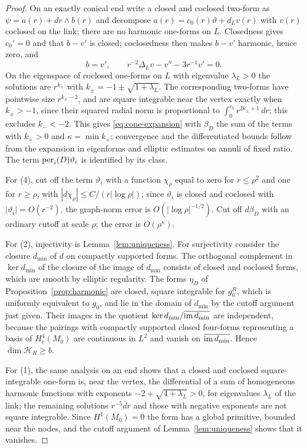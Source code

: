 \begin{proof}
On an exactly conical end write a closed and coclosed two-form as
$\psi=a(r)+dr\wedge b(r)$ and decompose
$a(r)=c_0(r)\vartheta+d_Lv(r)$ with $v(r)$ coclosed on the link; there are
no harmonic one-forms on $L$. Closedness gives $c_0'=0$ and that $b-v'$
is closed; coclosedness then makes $b-v'$ harmonic, hence zero, and
\[
 b=v',\qquad r^{-2}\Delta_Lv-v''-3r^{-1}v'=0 .
\]
On the eigenspace of coclosed one-forms on $L$ with eigenvalue
$\lambda_L>0$ the solutions are $r^{k_\pm}$ with
$k_\pm=-1\pm\sqrt{1+\lambda_L}$. The corresponding two-forms have
pointwise size $r^{k_\pm-2}$, and are square integrable near the vertex
exactly when $k_\pm>-1$, since their squared radial norm is proportional
to $\int_0^{r_0}r^{2k_\pm+1}\,dr$; this excludes $k_-<-2$. This gives
\eqref{eq:cone-expansion} with $\beta_D$ the sum of the terms with
$k_+>0$ and $\kappa=\min k_+$; convergence and the differentiated bounds
follow from the expansion in eigenforms and elliptic estimates on
annuli of fixed ratio. The term $\operatorname{per}_i(D)\vartheta_i$ is identified by its
class.

For (4), cut off the term $\vartheta_i$ with a function $\chi_\rho$ equal
to zero for $r\le\rho^2$ and one for $r\ge\rho$, with
$|d\chi_\rho|\le C/(r|\log\rho|)$; since $\vartheta_i$ is closed and
coclosed with $|\vartheta_i|=O(r^{-2})$, the graph-norm error is
$O(|\log\rho|^{-1/2})$. Cut off $d\beta_D$ with an ordinary cutoff at
scale $\rho$; the error is $O(\rho^{\kappa})$.

For (2), injectivity is Lemma~\ref{lem:uniqueness}. For surjectivity
consider the closure $d_{\min}$ of $d$ on compactly supported forms. The
orthogonal complement in $\ker d_{\min}$ of the closure of the image of
$d_{\min}$ consists of closed and coclosed forms, which are smooth by
elliptic regularity. The forms $\eta_D$ of
Proposition~\ref{prop:harmonic} are closed, square integrable for
$g_0^R$, which is uniformly equivalent to $g_0$, and lie in the domain of
$d_{\min}$ by the cutoff argument just given. Their images in the
quotient $\ker d_{\min}/\overline{\operatorname{im} d_{\min}}$ are independent, because
the pairings with compactly supported closed four-forms representing a
basis of $H^4_c(M_0)$ are continuous in $L^2$ and vanish on
$\overline{\operatorname{im} d_{\min}}$. Hence $\dim\mathcal H_R\ge b$.

For (1), the same analysis on an end shows that a closed and coclosed
square-integrable one-form is, near the vertex, the differential of a
sum of homogeneous harmonic functions with exponents
$-2+\sqrt{4+\lambda_L}>0$, for eigenvalues $\lambda_L$ of the link; the remaining solutions $r^{-5}dr$ and those with
negative exponents are not square integrable. Since $H^1(M_0)=0$ the
form has a global primitive, bounded near the nodes, and the cutoff
argument of Lemma~\ref{lem:uniqueness} shows that it vanishes.
\end{proof}


